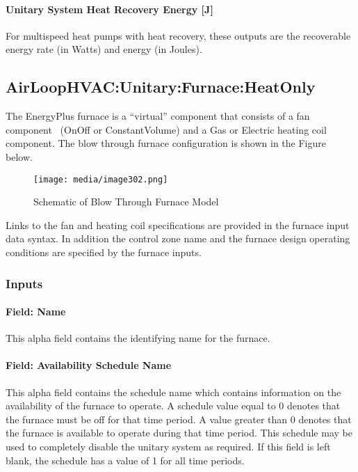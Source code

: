 \paragraph{Unitary System Heat Recovery Energy {[}J{]}}\label{unitary-system-heat-recovery-energy-j-1}

For multispeed heat pumps with heat recovery, these outputs are the recoverable energy rate (in Watts) and energy (in Joules).

\subsection{AirLoopHVAC:Unitary:Furnace:HeatOnly}\label{airloophvacunitaryfurnaceheatonly}

The EnergyPlus furnace is a ``virtual'' component that consists of a fan component~ (OnOff or ConstantVolume) and a Gas or Electric heating coil component. The blow through furnace configuration is shown in the Figure below.

\begin{figure}[hbtp] %
\centering
\texttt{[image: media/image302.png]}
\caption{Schematic of Blow Through Furnace Model \protect \label{fig:schematic-of-blow-through-furnace-model}}
\end{figure}

Links to the fan and heating coil specifications are provided in the furnace input data syntax. In addition the control zone name and the furnace design operating conditions are specified by the furnace inputs.

\subsubsection{Inputs}\label{inputs-5-033}

\paragraph{Field: Name}\label{field-name-6-025}

This alpha field contains the identifying name for the furnace.

\paragraph{Field: Availability Schedule Name}\label{field-availability-schedule-name-5-004}

This alpha field contains the schedule name which contains information on the availability of the furnace to operate. A schedule value equal to 0 denotes that the furnace must be off for that time period. A value greater than 0 denotes that the furnace is available to operate during that time period. This schedule may be used to completely disable the unitary system as required. If this field is left blank, the schedule has a value of 1 for all time periods.

